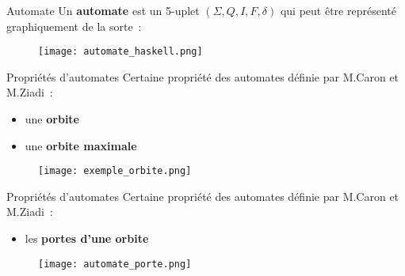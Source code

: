 \documentclass[aspectratio=169,xcolor=dvipsnames]{beamer}
\begin{document}

\begin{frame}
    \begin{block}{Automate}
        Un \textbf{automate} est un 5-uplet \((\Sigma, Q, I, F, \delta)\) qui 
        peut être représenté graphiquement de la sorte~: 
    \end{block}
    \begin{figure}
        \texttt{[image: automate\_haskell.png]}
    \end{figure}
\end{frame}


\begin{frame}
    \begin{block}{Propriétés d'automates}
        Certaine propriété des automates définie par M.Caron et M.Ziadi~:
        \begin{itemize}
            \item une \textbf{orbite}
            \item une \textbf{orbite maximale}
        \end{itemize}
    \end{block}
    \begin{figure}
        \texttt{[image: exemple\_orbite.png]}
    \end{figure}
\end{frame}


\begin{frame}
    \begin{block}{Propriétés d'automates}
        Certaine propriété des automates définie par M.Caron et M.Ziadi~:
        \begin{itemize}
            \item les \textbf{portes d'une orbite}
        \end{itemize}
    \end{block}
    \begin{figure}
        \texttt{[image: automate\_porte.png]}
    \end{figure}
\end{frame}
\end{document}
